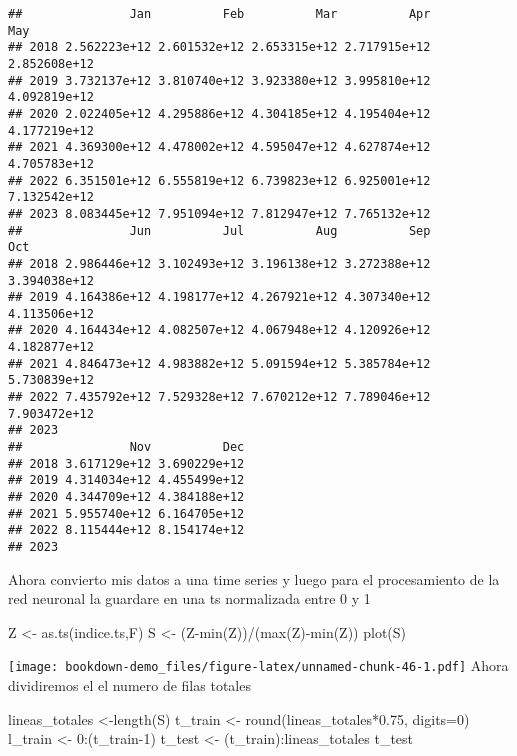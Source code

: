 \documentclass[
]{book}
\newenvironment{Shaded}{\begin{snugshade}}{\end{snugshade}}
\newcommand{\AttributeTok}[1]{\textcolor[rgb]{0.77,0.63,0.00}{#1}}
\newcommand{\DecValTok}[1]{\textcolor[rgb]{0.00,0.00,0.81}{#1}}
\newcommand{\FloatTok}[1]{\textcolor[rgb]{0.00,0.00,0.81}{#1}}
\newcommand{\FunctionTok}[1]{\textcolor[rgb]{0.00,0.00,0.00}{#1}}
\newcommand{\NormalTok}[1]{#1}
\newcommand{\OtherTok}[1]{\textcolor[rgb]{0.56,0.35,0.01}{#1}}
\newcommand{\SpecialCharTok}[1]{\textcolor[rgb]{0.00,0.00,0.00}{#1}}
\begin{document}
\begin{verbatim}
##               Jan          Feb          Mar          Apr          May
## 2018 2.562223e+12 2.601532e+12 2.653315e+12 2.717915e+12 2.852608e+12
## 2019 3.732137e+12 3.810740e+12 3.923380e+12 3.995810e+12 4.092819e+12
## 2020 2.022405e+12 4.295886e+12 4.304185e+12 4.195404e+12 4.177219e+12
## 2021 4.369300e+12 4.478002e+12 4.595047e+12 4.627874e+12 4.705783e+12
## 2022 6.351501e+12 6.555819e+12 6.739823e+12 6.925001e+12 7.132542e+12
## 2023 8.083445e+12 7.951094e+12 7.812947e+12 7.765132e+12             
##               Jun          Jul          Aug          Sep          Oct
## 2018 2.986446e+12 3.102493e+12 3.196138e+12 3.272388e+12 3.394038e+12
## 2019 4.164386e+12 4.198177e+12 4.267921e+12 4.307340e+12 4.113506e+12
## 2020 4.164434e+12 4.082507e+12 4.067948e+12 4.120926e+12 4.182877e+12
## 2021 4.846473e+12 4.983882e+12 5.091594e+12 5.385784e+12 5.730839e+12
## 2022 7.435792e+12 7.529328e+12 7.670212e+12 7.789046e+12 7.903472e+12
## 2023                                                                 
##               Nov          Dec
## 2018 3.617129e+12 3.690229e+12
## 2019 4.314034e+12 4.455499e+12
## 2020 4.344709e+12 4.384188e+12
## 2021 5.955740e+12 6.164705e+12
## 2022 8.115444e+12 8.154174e+12
## 2023
\end{verbatim}

Ahora convierto mis datos a una time series y luego para el procesamiento de la red neuronal la guardare en una ts normalizada entre 0 y 1

\begin{Shaded}
\begin{Highlighting}[]
\NormalTok{Z }\OtherTok{\textless{}{-}} \FunctionTok{as.ts}\NormalTok{(indice.ts,F)}
\NormalTok{S }\OtherTok{\textless{}{-}}\NormalTok{ (Z}\SpecialCharTok{{-}}\FunctionTok{min}\NormalTok{(Z))}\SpecialCharTok{/}\NormalTok{(}\FunctionTok{max}\NormalTok{(Z)}\SpecialCharTok{{-}}\FunctionTok{min}\NormalTok{(Z))}
\FunctionTok{plot}\NormalTok{(S)}
\end{Highlighting}
\end{Shaded}

\texttt{[image: bookdown-demo\_files/figure-latex/unnamed-chunk-46-1.pdf]}
Ahora dividiremos el el numero de filas totales

\begin{Shaded}
\begin{Highlighting}[]
\NormalTok{lineas\_totales }\OtherTok{\textless{}{-}}\FunctionTok{length}\NormalTok{(S)}
\NormalTok{t\_train }\OtherTok{\textless{}{-}} \FunctionTok{round}\NormalTok{(lineas\_totales}\SpecialCharTok{*}\FloatTok{0.75}\NormalTok{, }\AttributeTok{digits=}\DecValTok{0}\NormalTok{)}
\NormalTok{l\_train }\OtherTok{\textless{}{-}} \DecValTok{0}\SpecialCharTok{:}\NormalTok{(t\_train}\DecValTok{{-}1}\NormalTok{) }
\NormalTok{t\_test }\OtherTok{\textless{}{-}}\NormalTok{ (t\_train)}\SpecialCharTok{:}\NormalTok{lineas\_totales}
\NormalTok{t\_test}
\end{Highlighting}
\end{Shaded}
\end{document}
